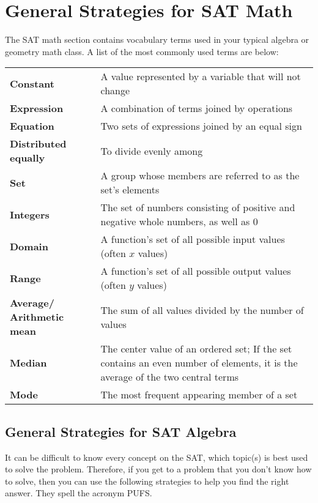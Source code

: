 \chapter{General Strategies for SAT Math}

The SAT math section contains vocabulary terms used in your typical algebra or geometry math class. A list of the most commonly used terms are below:

\bigskip

\renewcommand{\arraystretch}{2}
\begin{tabularx}{\textwidth}{p{1.6in}X}
\textbf{Constant} & A value represented by a variable that will not change\\
\textbf{Expression} & A combination of terms joined by operations\\
\textbf{Equation} & Two sets of expressions joined by an equal sign\\
\textbf{Distributed equally} & To divide evenly among\\
\textbf{Set} & A group whose members are referred to as the set's elements\\
\textbf{Integers} & The set of numbers consisting of positive and negative whole numbers, as well as 0\\
\textbf{Domain} & A function's set of all possible input values (often $x$ values)\\
\textbf{Range} & A function's set of all possible output values (often $y$ values)\\
\textbf{Average/\hspace{2em} Arithmetic mean} & The sum of all values divided by the number of values\\
\textbf{Median} & The center value of an ordered set; If the set contains an even number of elements, it is the average of the two central terms\\
\textbf{Mode} & The most frequent appearing member of a set\\
\end{tabularx}


\vfill
\newpage
\section[SAT Algebra]{General Strategies for SAT Algebra}

It can be difficult to know every concept on the SAT, which topic(s) is best used to solve the problem. Therefore, if you get to a problem that you don't know how to solve, then you can use the following strategies to help you find the right answer. They spell the acronym PUFS.

